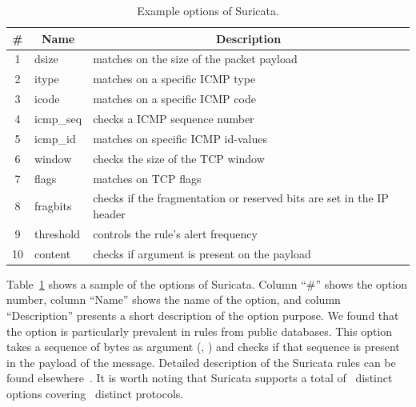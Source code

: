 \documentclass[sigconf,review, anonymous]{acmart}
\begin{document}
\vspace{-1ex}
\begin{table}[h!]
  \footnotesize
  \caption{\label{table:rules}Example options of Suricata.}
  \vspace{-2ex}
  \centering
  \begin{tabular}{clp{5.5cm}}
    \toprule
    \multicolumn{1}{c}{\#} & \multicolumn{1}{c}{Name} &  \multicolumn{1}{c}{Description}\\
    \midrule     
    1 & dsize & matches on the size of the packet payload\\
    2 & itype &  matches on a specific ICMP type\\
    3 & icode & matches on a specific ICMP code\\
    4 & icmp\_seq  & checks a ICMP sequence number\\
    5 & icmp\_id & matches on specific ICMP id-values\\
    6 & window & checks the size of the TCP window\\
    7 & flags & matches on TCP flags\\
    8 & fragbits & checks if the fragmentation or reserved bits are set in the IP header\\
    9 & threshold & controls the rule’s alert frequency\\
    10 & content & checks if argument is present on the payload\\
    \bottomrule
  \end{tabular}
\end{table}

Table~\ref{table:rules} shows a sample of the options of
Suricata. Column ``\#'' shows the option number, column ``Name'' shows
the name of the option, and column ``Description'' presents a short
description of the option purpose. We found that the option
 is particularly prevalent in rules from public
databases. This
option takes a sequence of bytes as argument (\eg{},
) and checks if that sequence is present
in the payload of the message. Detailed description of the Suricata
rules can be found elsewhere~\cite{suri-rule-format}. It is worth
noting that Suricata supports a total of \totoptions\ distinct options
covering \numproto\ distinct protocols.


\end{document}

